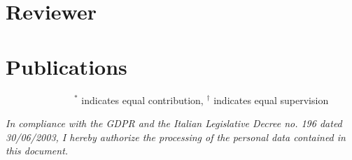 \documentclass[11pt, a4paper]{moderncv}
\begin{document}
\section{Reviewer}

\section{Publications}





\vspace{-1.2mm}
\small{ $\quad \quad\quad\quad\quad\quad \quad^*$ indicates equal contribution, $^\dag$ indicates equal supervision}

\vfill
\enlargethispage{\footskip}
\textit{In compliance with the GDPR and the Italian Legislative Decree no. 196 dated 30/06/2003, I hereby authorize the processing of the personal data contained in this document.}
\end{document}

